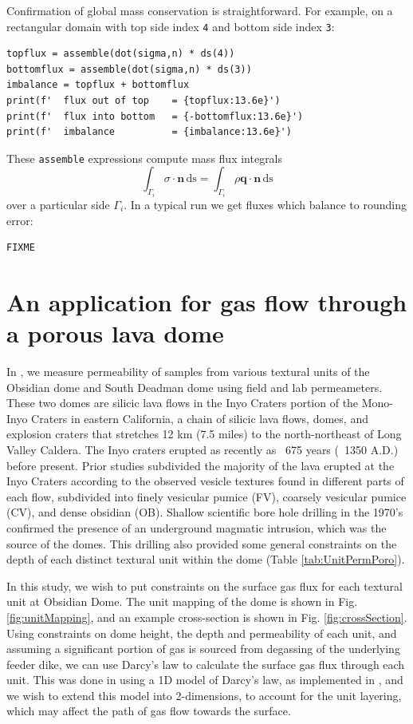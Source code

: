 \documentclass[11pt]{amsart}
\newcommand{\bn}{\mathbf{n}}
\newcommand{\bq}{\mathbf{q}}
\newcommand{\ds}{\mathrm{ds}}
\begin{document}
Confirmation of global mass conservation is straightforward.  For example, on a rectangular domain with top side index \verb|4| and bottom side index \verb|3|:
\begin{Verbatim}[fontsize=\small,frame=lines]
topflux = assemble(dot(sigma,n) * ds(4))
bottomflux = assemble(dot(sigma,n) * ds(3))
imbalance = topflux + bottomflux
print(f'  flux out of top    = {topflux:13.6e}')
print(f'  flux into bottom   = {-bottomflux:13.6e}')
print(f'  imbalance          = {imbalance:13.6e}')
\end{Verbatim}
These \verb|assemble| expressions compute mass flux integrals
    $$\int_{\Gamma_i} \sigma\cdot \bn\,\ds = \int_{\Gamma_i} \rho \bq\cdot \bn\,\ds$$
over a particular side $\Gamma_i$.  In a typical run we get fluxes which balance to rounding error:
\begin{Verbatim}[fontsize=\small,frame=leftline]
FIXME
\end{Verbatim}


\section{An application for gas flow through a porous lava dome}

In \cite{Graham2023}, we measure permeability of samples from various textural units of the Obsidian dome and South Deadman dome using field and lab permeameters. These two domes are silicic lava flows in the Inyo Craters portion of the Mono-Inyo Craters in eastern California, a chain of silicic lava flows, domes, and explosion craters that stretches 12 km (7.5 miles) to the north-northeast of Long Valley Caldera. The Inyo craters erupted as recently as ~675 years (~1350 A.D.) before present. Prior studies subdivided the majority of the lava erupted at the Inyo Craters according to the observed vesicle textures found in different parts of each flow, subdivided into finely vesicular pumice (FV), coarsely vesicular pumice (CV), and dense obsidian (OB). Shallow scientific bore hole drilling in the 1970's confirmed the presence of an underground magmatic intrusion, which was the source of the domes. This drilling also provided some general constraints on the depth of each distinct textural unit within the dome (Table \ref{tab:UnitPermPoro}).

In this study, we wish to put constraints on the surface gas flux for each textural unit at Obsidian Dome. The unit mapping of the dome is shown in Fig. \ref{fig:unitMapping}, and an example cross-section is shown in Fig. \ref{fig:crossSection}. Using constraints on dome height, the depth and permeability of each unit, and assuming a significant portion of gas is sourced from degassing of the underlying feeder dike, we can use Darcy's law to calculate the surface gas flux through each unit. This was done in \cite{Graham2023} using a 1D model of Darcy's law, as implemented in \cite{Edmonds2003}, and we wish to extend this model into 2-dimensions, to account for the unit layering, which may affect the path of gas flow towards the surface.
\end{document}
